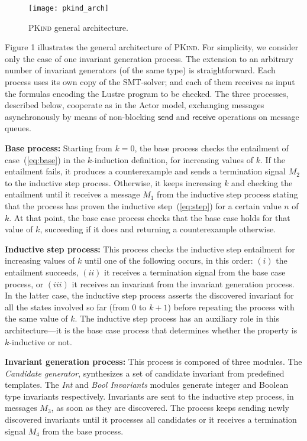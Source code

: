 \documentclass[submission,copyright,creativecommons]{eptcs}
\newcommand{\PKind}{\textrm{\textsc{PKind}}\xspace}
\begin{document}
\begin{figure}[t] \centering
\texttt{[image: pkind\_arch]} 
\caption{
\PKind general architecture.
}
\label{fig:pkind_arch}
\end{figure}


Figure 1 
illustrates the general architecture of
\PKind.  For simplicity, we consider only the case of one invariant
generation process.  The extension to an arbitrary number of invariant
generators (of the same type) is straightforward.  Each process uses
its own copy of the SMT-solver; and each of them receives as input the
formulas encoding the Lustre program to be checked.  The three
processes, described below, cooperate as in the Actor model,
exchanging messages asynchronously by means of non-blocking
$\mathsf{send}$ and $\mathsf{receive}$ operations on message queues.
\medskip

\noindent
\textbf{Base process:}
Starting from $k=0$, the base process checks the
  entailment of case~(\ref{eq:base}) in the $k$-induction definition,
  for increasing values of $k$.  If the entailment fails, it produces
  a counterexample and sends a termination signal $M_2$ to the
  inductive step process.  Otherwise, it keeps increasing $k$ and
  checking the entailment until it receives a message $M_1$ from the
  inductive step process stating that the process has
  proven the inductive step~(\ref{eq:step}) for a certain value $n$
  of $k$.  At that point, the base case process checks that the base
  case holds for that value of $k$, succeeding if it does and
  returning a counterexample otherwise.
\medskip

\noindent
\textbf{Inductive step process:}
This process checks the inductive step entailment for increasing
  values of $k$ until one of the following occurs, in this order:
  $(i)$ the entailment succeeds, $(ii)$ it receives a termination
  signal from the base case process, or $(iii)$ it receives an
  invariant from the invariant generation process.  In the
  latter case, the inductive step process asserts the discovered
  invariant for all the states involved so far (from $0$ to $k+1$)
  before repeating the process with the same value of $k$. The inductive
  step process has an auxiliary role in this architecture---it is the base case process
  that determines whether the property is $k$-inductive or not.

\medskip

\noindent
\textbf{Invariant generation process:} 
This process is composed of three modules. The \textit{Candidate
  generator}, synthesizes a set of candidate invariant from predefined
templates.  The \textit{Int} and \textit{Bool Invariants} modules
generate integer and Boolean type invariants respectively.
Invariants
are sent to the inductive step process, in messages $M_3$, as soon as
they are discovered. The process keeps sending newly discovered
invariants until it processes all candidates or it receives a
termination signal $M_4$ from the base process.
\end{document}
